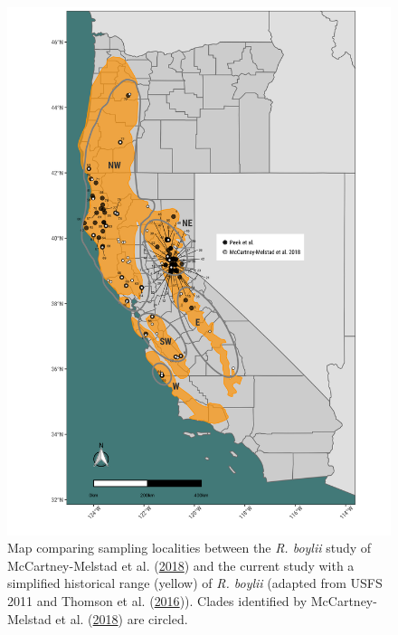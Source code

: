 \documentclass[proquest,12pt,final]{ucthesis-CA2012} %
\begin{document}
\begin{ucmainmatter}
\begin{figure}
\includegraphics[width=0.85\linewidth]{figure/ch3/fig_01_maps_all_rabo_filt10_1_100k_revrange_localities_annotated} \caption{Map comparing sampling localities between the \emph{R.
boylii} study of McCartney-Melstad et al.
(\protect\hyperlink{ref-mccartney-melstad_population_2018}{2018}) and
the current study with a simplified historical range (yellow) of
\emph{R. boylii} (adapted from USFS 2011 and Thomson et al.
(\protect\hyperlink{ref-thomson_california_2016}{2016})). Clades
identified by McCartney-Melstad et al.
(\protect\hyperlink{ref-mccartney-melstad_population_2018}{2018}) are
circled.}\label{fig:CH3F1map}
\end{figure}
\clearpage


\end{ucmainmatter}
\end{document}
